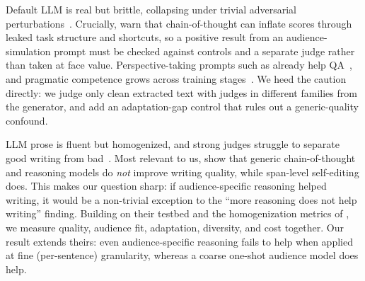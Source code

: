  Default LLM \tom is real but
brittle, collapsing under trivial adversarial perturbations~\citep{ullman2023large,
shapira2023clever}. Crucially, \citet{shapira2023clever} warn that chain-of-thought can inflate
\tom scores through leaked task structure and shortcuts, so a positive result from an
audience-simulation prompt must be checked against controls and a separate judge rather than taken
at face value. Perspective-taking prompts such as \simtom already help \tom
QA~\citep{tomsurvey2025}, and pragmatic competence grows across training
stages~\citep{altprag2025}. We heed the caution directly: we judge only clean extracted text with
judges in different families from the generator, and add an adaptation-gap control that rules out a
generic-quality confound.

 LLM prose is fluent but homogenized, and strong judges
struggle to separate good writing from bad~\citep{homogenization2026}. Most relevant to us,
\citet{chakrabarty2025aislop} show that generic chain-of-thought and reasoning models do
\emph{not} improve writing quality, while span-level self-editing does. This makes our question
sharp: if audience-specific reasoning helped writing, it would be a non-trivial exception to the
``more reasoning does not help writing'' finding. Building on their testbed and the homogenization
metrics of \citet{homogenization2026}, we measure quality, audience fit, adaptation, diversity,
and cost together. Our result extends theirs: even audience-specific reasoning fails to help when
applied at fine (per-sentence) granularity, whereas a coarse one-shot audience model does help.
